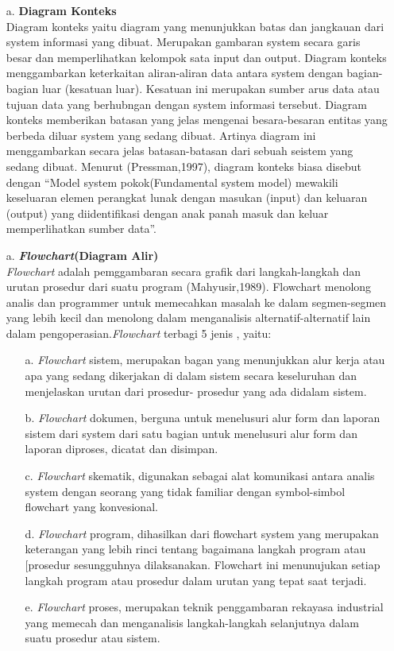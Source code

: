 \documentclass{jtetiproposalskripsi}
\begin{document}
\begin{itemize}
\item[a.]\textbf{Diagram Konteks}
\\
Diagram konteks yaitu diagram yang menunjukkan batas dan jangkauan dari system informasi yang dibuat. Merupakan gambaran system secara garis besar dan memperlihatkan kelompok sata input dan output. Diagram konteks menggambarkan keterkaitan aliran-aliran data antara system  dengan  bagian-bagian luar  (kesatuan luar).  Kesatuan  ini  merupakan sumber arus data atau tujuan data yang berhubngan dengan system informasi tersebut. Diagram konteks memberikan batasan yang jelas mengenai besara-besaran   entitas yang berbeda diluar system yang sedang dibuat. Artinya diagram ini menggambarkan secara jelas batasan-batasan dari sebuah seistem yang sedang dibuat. Menurut (Pressman,1997), diagram konteks biasa disebut  dengan “Model system pokok(Fundamental system model) mewakili keseluaran elemen perangkat lunak dengan masukan (input) dan keluaran (output) yang diidentifikasi dengan anak panah masuk dan keluar memperlihatkan sumber data”.

\item[a.]\textbf{\textit{Flowchart}(Diagram Alir)}
\\
\textit{Flowchart} adalah pemggambaran secara grafik dari langkah-langkah dan urutan prosedur dari suatu program (Mahyusir,1989). Flowchart menolong analis dan programmer untuk memecahkan masalah ke dalam segmen-segmen yang lebih kecil dan menolong dalam menganalisis alternatif-alternatif lain dalam pengoperasian.\textit{Flowchart} terbagi 5 jenis , yaitu:
\begin{itemize}
\item[a.]\textit{Flowchart} sistem, merupakan bagan yang menunjukkan alur kerja atau apa yang sedang dikerjakan di dalam sistem secara keseluruhan dan menjelaskan urutan dari prosedur- prosedur yang ada didalam sistem.
\item[b.]\textit{Flowchart} dokumen, berguna untuk menelusuri alur form dan   laporan   sistem dari system dari satu bagian untuk menelusuri alur form dan  laporan diproses, dicatat dan disimpan.
\item[c.]\textit{Flowchart} skematik, digunakan sebagai alat komunikasi antara analis system dengan seorang yang tidak familiar dengan symbol-simbol flowchart yang konvesional.
\item[d.]\textit{Flowchart} program, dihasilkan dari flowchart system yang merupakan keterangan yang lebih rinci tentang bagaimana langkah program atau [prosedur sesungguhnya dilaksanakan. Flowchart ini menunujukan setiap langkah program atau prosedur dalam urutan yang tepat saat terjadi.
\item[e.]\textit{Flowchart} proses, merupakan teknik penggambaran rekayasa industrial yang memecah dan menganalisis langkah-langkah selanjutnya dalam suatu prosedur atau sistem.
\end{itemize}
\end{itemize}
\end{document}
